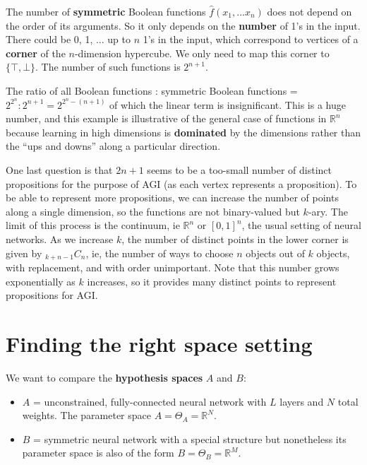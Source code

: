 \begin{preview}
\begin{minipage}{\textwidth}
The number of \textbf{symmetric} Boolean functions $\hat{f}(x_1, ... x_n)$ does not depend on the order of its arguments.  So it only depends on the \textbf{number} of 1's in the input.  There could be 0, 1, ... up to $n$ 1's in the input, which correspond to vertices of a \textbf{corner} of the $n$-dimension hypercube.  We only need to map this corner to $\{ \top, \bot\}$.  The number of such functions is $2^{n + 1}$.

The ratio of all Boolean functions : symmetric Boolean functions = $2^{2^n} : 2^{n+1} = 2^{2^n - (n+1)}$ of which the linear term is insignificant.  This is a huge number, and this example is illustrative of the general case of functions in $\mathbb{R}^n$ because learning in high dimensions is \textbf{dominated} by the dimensions rather than the ``ups and downs'' along a particular direction.

One last question is that $2n + 1$ seems to be a too-small number of distinct propositions for the purpose of AGI (as each vertex represents a proposition).  To be able to represent more propositions, we can increase the number of points along a single dimension, so the functions are not binary-valued but $k$-ary.  The limit of this process is the continuum, ie $\mathbb{R}^n$ or $[0,1]^n$, the usual setting of neural networks.  As we increase $k$, the number of distinct points in the lower corner is given by ${}_{k+n-1}C_{n}$, ie, the number of ways to choose $n$ objects out of $k$ objects, with replacement, and with order unimportant.  Note that this number grows exponentially as $k$ increases, so it provides many distinct points to represent propositions for AGI.

\section{Finding the right space setting}

We want to compare the \textbf{hypothesis spaces} $A$ and $B$:
\begin{itemize}
	\item $A$ = unconstrained, fully-connected neural network with $L$ layers and $N$ total weights.  The parameter space $A = \Theta_A = \mathbb{R}^N$.
	\item $B$ = symmetric neural network with a special structure but nonetheless its parameter space is also of the form $B = \Theta_B = \mathbb{R}^M$.
\end{itemize}


\end{minipage}
\end{preview}
